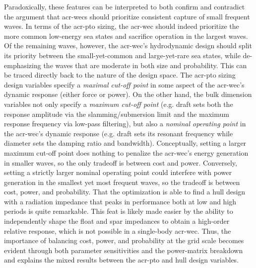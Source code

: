 Paradoxically, these features can be interpreted to both confirm and contradict the argument that \glspl{acr-wec} should prioritize consistent capture of small frequent waves.
In terms of the \gls{acr-pto} sizing, the \gls{acr-wec} should indeed prioritize the more common low-energy sea states and sacrifice operation in the largest waves.
Of the remaining waves, however, the \gls{acr-wec}'s hydrodynamic design should split its priority between the small-yet-common and large-yet-rare sea states, while de-emphasizing the waves that are moderate in both size and probability.
This can be traced directly back to the nature of the design space.
The \gls{acr-pto} sizing design variables specify a \textit{maximal cut-off point} in some aspect of the \gls{acr-wec}'s dynamic response (either force or power).
On the other hand, the bulk dimension variables not only specify a \textit{maximum cut-off point}
 (e.g. draft sets both the response amplitude via the slamming/submersion limit and the maximum response frequency via low-pass filtering),
but also a \textit{nominal operating point} in the \gls{acr-wec}'s dynamic response (e.g. draft sets its resonant frequency while diameter sets the damping ratio and bandwidth).
Conceptually, setting a larger maximum cut-off point does nothing to penalize the \gls{acr-wec}'s energy generation in smaller waves, so the only tradeoff is between cost and power.
Conversely, setting a strictly larger nominal operating point could interfere with power generation in the smallest yet most frequent waves, so the tradeoff is between cost, power, and probability.
That the optimization is able to find a hull design with a radiation impedance that peaks in performance both at low and high periods is quite remarkable.
This feat is likely made easier by the ability to independently shape the float and spar impedances to obtain a high-order relative response, which is not possible in a single-body \gls{acr-wec}. 
Thus, the importance of balancing cost, power, and probability at the grid scale becomes evident through both parameter sensitivities and the power-matrix breakdown and explains the mixed results between the \gls{acr-pto} and hull design variables.

